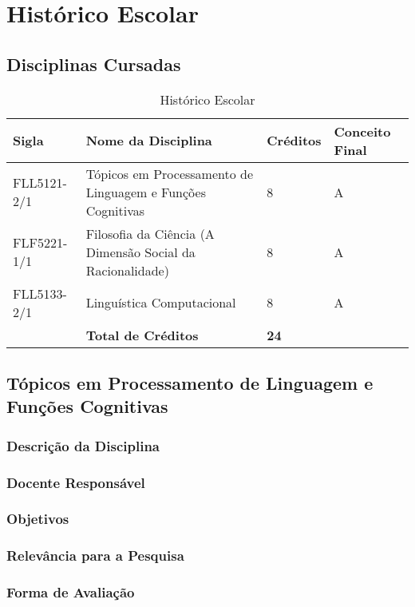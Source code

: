 \chapter{Histórico Escolar}
\label{ch:01-historicoescolar}

\section{Disciplinas Cursadas}

\begin{table}[ht!]
\center
\begin{tabular}{llll}
\textbf{Sigla}       & \textbf{Nome da Disciplina}                                         & \textbf{Créditos} & \textbf{Conceito Final} \\
\midrule
FLL5121-2/1 & Tópicos em Processamento de Linguagem e Funções Cognitivas & 8        & A              \\
FLF5221-1/1 & Filosofia da Ciência (A Dimensão Social da Racionalidade)   & 8        & A              \\
FLL5133-2/1 & Linguística Computacional                                  & 8        & A              \\
\midrule
            & \textbf{Total de Créditos}                                          & \textbf{24}       &               
\end{tabular}
\caption{Histórico Escolar}
\label{tab:historico}
\end{table}

\section{Tópicos em Processamento de Linguagem e Funções Cognitivas}
\subsection{Descrição da Disciplina}
\subsection{Docente Responsável}
\subsection{Objetivos}
\subsection{Relevância para a Pesquisa}
\subsection{Forma de Avaliação}
